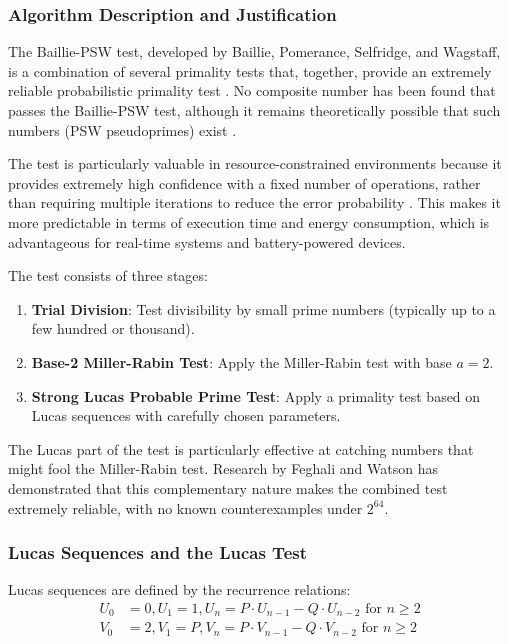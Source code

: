 \subsubsection{Algorithm Description and Justification}

The Baillie-PSW test, developed by Baillie, Pomerance, Selfridge, and Wagstaff, is a combination of several primality tests that, together, provide an extremely reliable probabilistic primality test \cite{baillie1980}. No composite number has been found that passes the Baillie-PSW test, although it remains theoretically possible that such numbers (PSW pseudoprimes) exist \cite{pomerance1984}.

The test is particularly valuable in resource-constrained environments because it provides extremely high confidence with a fixed number of operations, rather than requiring multiple iterations to reduce the error probability \cite{hardware_baillie}. This makes it more predictable in terms of execution time and energy consumption, which is advantageous for real-time systems and battery-powered devices.

The test consists of three stages:

\begin{enumerate}
    \item \textbf{Trial Division}: Test divisibility by small prime numbers (typically up to a few hundred or thousand).
    
    \item \textbf{Base-2 Miller-Rabin Test}: Apply the Miller-Rabin test with base $a = 2$.
    
    \item \textbf{Strong Lucas Probable Prime Test}: Apply a primality test based on Lucas sequences with carefully chosen parameters.
\end{enumerate}

The Lucas part of the test is particularly effective at catching numbers that might fool the Miller-Rabin test. Research by Feghali and Watson \cite{hardware_baillie} has demonstrated that this complementary nature makes the combined test extremely reliable, with no known counterexamples under $2^{64}$.

\subsubsection{Lucas Sequences and the Lucas Test}

Lucas sequences are defined by the recurrence relations:
\begin{align}
U_0 &= 0, U_1 = 1, U_n = P \cdot U_{n-1} - Q \cdot U_{n-2} \text{ for } n \geq 2 \\
V_0 &= 2, V_1 = P, V_n = P \cdot V_{n-1} - Q \cdot V_{n-2} \text{ for } n \geq 2
\end{align}

